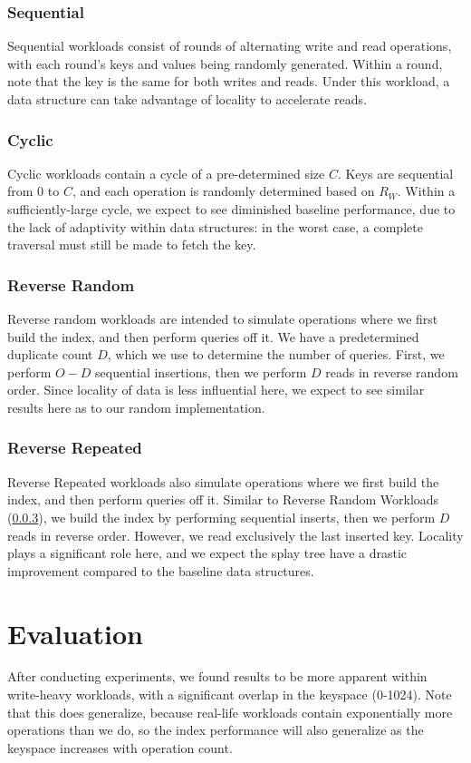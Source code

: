 \documentclass[sigconf]{acmart}
\begin{document}
\subsubsection{Sequential}
Sequential workloads consist of rounds of alternating write and read operations, with each round's keys and values being randomly generated. Within a round, note that the key is the same for both writes and reads. Under this workload, a data structure can take advantage of locality to accelerate reads.

\subsubsection{Cyclic}
Cyclic workloads contain a cycle of a pre-determined size $C$. Keys are sequential from $0$ to $C$, and each operation is randomly determined based on $R_W$. Within a sufficiently-large cycle, we expect to see diminished baseline performance, due to the lack of adaptivity within data structures: in the worst case, a complete traversal must still be made to fetch the key.

\subsubsection{Reverse Random}
\label{reverse_random}
Reverse random workloads are intended to simulate operations where we first build the index, and then perform queries off it. We have a predetermined duplicate count $D$, which we use to determine the number of queries. First, we perform $O-D$ sequential insertions, then we perform $D$ reads in reverse random order. Since locality of data is less influential here, we expect to see similar results here as to our random implementation.

\subsubsection{Reverse Repeated}
Reverse Repeated workloads also simulate operations where we first build the index, and then perform queries off it. Similar to Reverse Random Workloads (\ref{reverse_random}), we build the index by performing sequential inserts, then we perform $D$ reads in reverse order. However, we read exclusively the last inserted key. Locality plays a significant role here, and we expect the splay tree have a drastic improvement compared to the baseline data structures.

\section{Evaluation}
After conducting experiments, we found results to be more apparent within write-heavy workloads, with a significant overlap in the keyspace (0-1024). Note that this does generalize, because real-life workloads contain exponentially more operations than we do, so the index performance will also generalize as the keyspace increases with operation count.
\end{document}
